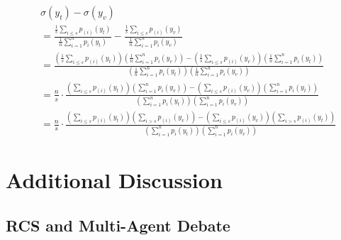 \begin{align*}
&\sigma(y_t) - \sigma(y_v) \\
&=
\frac{\frac{1}{s} \sum_{i \le s} p_{(i)}(y_t)}
     {\frac{1}{n} \sum_{i=1}^{n} p_i(y_t)}
-
\frac{\frac{1}{s} \sum_{i \le s} p_{(i)}(y_v)}
     {\frac{1}{n} \sum_{i=1}^{n} p_i(y_v)}
\\[2mm]
&=
\frac{
\left( \frac{1}{s} \sum_{i \le s} p_{(i)}(y_t) \right)
\left( \frac{1}{n} \sum_{i=1}^{n} p_i(y_v) \right)
-
\left( \frac{1}{s} \sum_{i \le s} p_{(i)}(y_v) \right)
\left( \frac{1}{n} \sum_{i=1}^{n} p_i(y_t) \right)
}{
\left( \frac{1}{n} \sum_{i=1}^{n} p_i(y_t) \right)
\left( \frac{1}{n} \sum_{i=1}^{n} p_i(y_v) \right)
}
\\[2mm]
&=
\frac{n}{s} \cdot
\frac{
\left( \sum_{i \le s} p_{(i)}(y_t) \right)
\left( \sum_{i=1}^{n} p_i(y_v) \right)
-
\left( \sum_{i \le s} p_{(i)}(y_v) \right)
\left( \sum_{i=1}^{n} p_i(y_t) \right)
}{
\left( \sum_{i=1}^{n} p_i(y_t) \right)
\left( \sum_{i=1}^{n} p_i(y_v) \right)
}
\\[2mm]
&=
\frac{n}{s} \cdot
\frac{
\left( \sum_{i \le s} p_{(i)}(y_t) \right)
\left( \sum_{i > s} p_{(i)}(y_v) \right)
-
\left( \sum_{i \le s} p_{(i)}(y_v) \right)
\left( \sum_{i > s} p_{(i)}(y_t) \right)
}{
\left( \sum_{i=1}^{n} p_i(y_t) \right)
\left( \sum_{i=1}^{n} p_i(y_v) \right)
}
\end{align*}


\section{Additional Discussion}
\subsection{RCS and Multi-Agent Debate}

